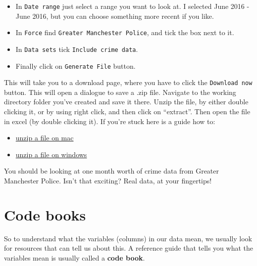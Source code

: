 \documentclass[
]{book}
\providecommand{\tightlist}{%
  \setlength{\itemsep}{0pt}\setlength{\parskip}{0pt}}
\begin{document}
\begin{itemize}
\tightlist
\item
  In \texttt{Date\ range} just select a range you want to look at. I selected June 2016 - June 2016, but you can choose something more recent if you like.
\item
  In \texttt{Force} find \texttt{Greater\ Manchester\ Police}, and tick the box next to it.
\item
  In \texttt{Data\ sets} tick \texttt{Include\ crime\ data}.
\item
  Finally click on \texttt{Generate\ File} button.
\end{itemize}

This will take you to a download page, where you have to click the \texttt{Download\ now} button. This will open a dialogue to save a .zip file. Navigate to the working directory folder you've created and save it there. Unzip the file, by either double clicking it, or by using right click, and then click on ``extract''. Then open the file in excel (by double clicking it). If you're stuck here is a guide how to:

\begin{itemize}
\tightlist
\item
  \href{https://www.dummies.com/computers/macs/how-to-zip-and-unzip-files-on-your-mac/}{unzip a file on mac}
\item
  \href{https://support.microsoft.com/en-us/help/4028088/windows-10-zip-and-unzip-files}{unzip a file on windows}
\end{itemize}

You should be looking at one month worth of crime data from Greater Manchester Police. Isn't that exciting? Real data, at your fingertips!

\hypertarget{code-books}{%
\section{Code books}\label{code-books}}

So to understand what the variables (columns) in our data mean, we usually look for resources that can tell us about this. A reference guide that tells you what the variables mean is usually called a \textbf{code book}.
\end{document}
